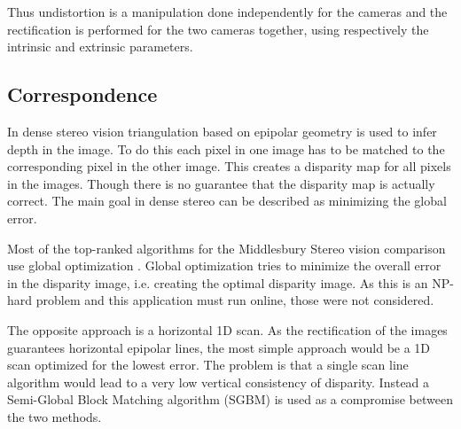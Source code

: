 %
%

Thus undistortion is a manipulation done independently for the cameras and the rectification is performed for the two cameras together, using respectively the intrinsic and extrinsic parameters.


\subsection{Correspondence} \label{sec:correspondence}
In dense stereo vision triangulation based on epipolar geometry is used to infer depth in the image. To do this each pixel in one image has to be matched to the corresponding pixel in the other image. This creates a disparity map for all pixels in the images. Though there is no guarantee that the disparity map is actually correct. The main goal in dense stereo can be described as minimizing the global error. 

Most of the top-ranked algorithms for the Middlesbury Stereo vision comparison use global optimization \cite{Hirschmuller2008}. Global optimization tries to minimize the overall error in the disparity image, i.e. creating the optimal disparity image. As this is an NP-hard problem and this application must run online, those were not considered.

The opposite approach is a horizontal 1D scan. As the rectification of the images guarantees horizontal epipolar lines, the most simple approach would be a 1D scan optimized for the lowest error. The problem is that a single scan line algorithm would lead to a very low vertical consistency of disparity. Instead a Semi-Global Block Matching algorithm (SGBM) is used as a compromise between the two methods. 

